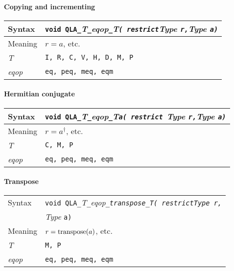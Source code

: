 \documentclass{article}
\newcommand{\namespace}{QLA}
\newcommand{\allEqOps}{{\tt eq, peq, meq, eqm}}
\newcommand{\allNumericTypes}{{\tt I, R, C, V, H, D, M, P}}
\newcommand{\ttdash}{{\tt \_}}
\newcommand{\itt}{\it T}
\newcommand{\extraarg}{}
\newcommand{\protoUnaryQual}[1]{{\tt void \namespace}\ttdash\itt\ttdash{\it eqop}\ttdash#1\ttdash\itt{\tt ( restrict}{\it Type }{\tt *r,}\\
 & {\it Type }{\tt *a\extraarg)}}
\newcommand{\protoUnary}{{\tt void \namespace}\ttdash\itt\ttdash{\it eqop}\ttdash\itt{\tt ( restrict}{\it Type }{\tt *r,}{\it Type }{\tt *a\extraarg)}}
\newcommand{\protoUnaryA}{{\tt void \namespace}\ttdash\itt\ttdash{\it eqop}\ttdash\itt{\tt a( restrict }{\it Type }{\tt *r,}{\it Type }{\tt *a\extraarg)}}
\newcommand{\shift}{}
\begin{document}
\paragraph{Copying and incrementing}

\begin{flushleft}
  \begin{tabular}{|l|l|}
  \hline
  Syntax      & \protoUnary  \\
  \hline
  Meaning     & $r = a$, etc. \\
  \hline
  \itt     & \allNumericTypes \\
  \hline
  {\it eqop}  & \allEqOps \\
  \hline
  \end{tabular}
\end{flushleft}

\shift

\paragraph{Hermitian conjugate}

\begin{flushleft}
  \begin{tabular}{|l|l|}
  \hline
  Syntax      & \protoUnaryA  \\
  \hline
  Meaning     & $r = a^\dagger$, etc. \\
  \hline
  \itt     & {\tt C, M, P} \\
  \hline
  {\it eqop}  & \allEqOps \\
  \hline
  \end{tabular}
\end{flushleft}

\paragraph{Transpose}

\begin{flushleft}
  \begin{tabular}{|l|l|}
  \hline
  Syntax      & \protoUnaryQual{\tt transpose}  \\
  \hline
  Meaning     & $r = {\rm transpose}(a)$, etc. \\
  \hline
  \itt     & {\tt M, P} \\
  \hline
  {\it eqop}  & \allEqOps \\
  \hline
  \end{tabular}
\end{flushleft}
\end{document}
